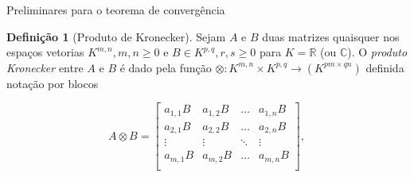 \documentclass{beamer}
\newcommand{\R}{\mathbb{R}}
\newcommand{\C}{\mathbb{C}}
\theoremstyle{plain}
\theoremstyle{definition}
\newtheorem{defi}{Definição}
\begin{document}

\begin{frame}{Preliminares para o teorema de convergência}

    \small
    \begin{defi}[Produto de Kronecker]
        \label{apendices:def:kronecker_product}
        Sejam $A$ e $B$ duas matrizes quaisquer nos espaços vetorias $K^{m, n}, m,n \geq 0$ e $B \in K^{p, q}, r,s \geq 0$ 
        para $K = \R$ (ou $\C$). O \textit{produto Kronecker} entre $A$ e $B$ é dado pela função
        $\otimes: K^{m, n} \times K^{p, q} \to (K^{pm \times qn})$ definida notação por blocos

        \[
            A \otimes B = 
            \begin{bmatrix}
                a_{1,1} B & a_{1,2} B & \dots & a_{1, n} B \\
                a_{2,1} B & a_{2,2} B & \dots & a_{2, n} B \\
                \vdots & \vdots & \ddots & \vdots \\
                a_{m,1} B & a_{m,2} B & \dots & a_{m, n} B \\
            \end{bmatrix},
        \]


    \end{defi}

     
\end{frame}


\end{document}

